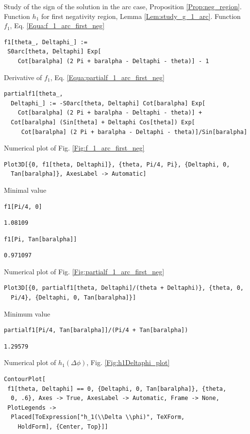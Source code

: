 \documentclass[reqno]{amsart}
\theoremstyle{definition} \newtheorem{definition}{Definition}[section]
\theoremstyle{definition} \newtheorem{remark}[definition]{Remark}
\theoremstyle{plain} \newtheorem{lemma}[definition]{Lemma}
\theoremstyle{plain} \newtheorem{proposition}[definition]{Proposition}
\theoremstyle{plain} \newtheorem{theorem}[definition]{Theorem}
\theoremstyle{plain} \newtheorem{corollary}[definition]{Corollary}
\theoremstyle{definition} \newtheorem{example}[definition]{Example}
\theoremstyle{plain} \newtheorem{claim}[clai]{Claim}
\theoremstyle{definition} \newtheorem{assumption}[definition]{Assumption}
\theoremstyle{definition} \newtheorem{observation}[definition]{Observation}
\newcommand{\1}{\mathbbm 1}
\newcommand{\smed}{\medskip}
\numberwithin{equation}{section} %
\theoremstyle{plain} \newtheorem*{theorem*}{Theorem}
\theoremstyle{plain} \newtheorem{mthm}[maintheorem]{Main Theorem}
\theoremstyle{plain} \newtheorem*{mthm*}{Main Theorem}
\theoremstyle{plain} \newtheorem*{conjecture*}{Conjecture}
\theoremstyle{plain} \newtheorem{conjecture}[definition]{Conjecture}
\theoremstyle{plain} \newtheorem*{problem*}{Problem}
\begin{document}
\noindent Study of the sign of the solution in the arc case, Proposition \ref{Prop:neg_region}. Function $h_1$ for first negativity region, Lemma \ref{Lem:study_g_1_arc}. Function $f_1$, Eq. \eqref{Equa:f_1_arc_first_neg}
\medskip
\begin{verbatim}
f1[theta_, Deltaphi_] := 
 S0arc[theta, Deltaphi] Exp[
    Cot[baralpha] (2 Pi + baralpha - Deltaphi - theta)] - 1
\end{verbatim}
\medskip
Derivative of $f_1$, Eq. \eqref{Equa:partialf_1_arc_first_neg}
\medskip
\begin{verbatim}
partialf1[theta_, 
  Deltaphi_] := -S0arc[theta, Deltaphi] Cot[baralpha] Exp[
    Cot[baralpha] (2 Pi + baralpha - Deltaphi - theta)] + 
  Cot[baralpha] (Sin[theta] + Deltaphi Cos[theta]) Exp[
     Cot[baralpha] (2 Pi + baralpha - Deltaphi - theta)]/Sin[baralpha]
\end{verbatim}
\medskip
Numerical plot of Fig. \ref{Fig:f_1_arc_first_neg}
\medskip
\begin{verbatim}
Plot3D[{0, f1[theta, Deltaphi]}, {theta, Pi/4, Pi}, {Deltaphi, 0, 
  Tan[baralpha]}, AxesLabel -> Automatic]
\end{verbatim}
\medskip
Minimal value
\smed
\begin{verbatim}
f1[Pi/4, 0]
\end{verbatim}
\begin{verbatim}
1.08109
\end{verbatim}
\begin{verbatim}
f1[Pi, Tan[baralpha]]
\end{verbatim}
\begin{verbatim}
0.971097
\end{verbatim}
\smed
Numerical plot of Fig. \ref{Fig:partialf_1_arc_first_neg}
\smed
\begin{verbatim}
Plot3D[{0, partialf1[theta, Deltaphi]/(theta + Deltaphi)}, {theta, 0, 
  Pi/4}, {Deltaphi, 0, Tan[baralpha]}]
\end{verbatim}
\smed
Minimum value
\smed
\begin{verbatim}
partialf1[Pi/4, Tan[baralpha]]/(Pi/4 + Tan[baralpha])
\end{verbatim}
\begin{verbatim}
1.29579
\end{verbatim}
Numerical plot of $h_1(\Delta \phi)$, Fig. \ref{Fig:h1Deltaphi_plot}
\smed
\begin{verbatim}
ContourPlot[
 f1[theta, Deltaphi] == 0, {Deltaphi, 0, Tan[baralpha]}, {theta, 
  0, .6}, Axes -> True, AxesLabel -> Automatic, Frame -> None, 
 PlotLegends -> 
  Placed[ToExpression["h_1(\\Delta \\phi)", TeXForm, 
    HoldForm], {Center, Top}]]
\end{verbatim}
\end{document}
